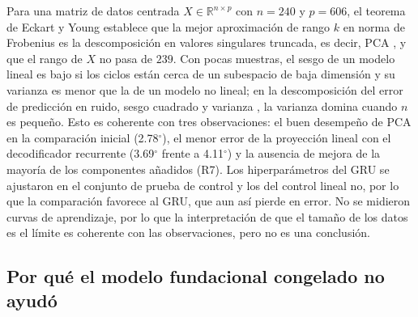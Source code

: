 \documentclass[11pt,a4paper]{article}
\newcommand{\gr}{$^{\circ}$}
\newcommand{\R}{\mathbb{R}}
\begin{document}
Para una matriz de datos centrada $X\in\R^{n\times p}$ con $n=240$ y $p=606$, el teorema de Eckart y Young \cite{eckart1936} establece que la mejor aproximación de rango $k$ en norma de Frobenius es la descomposición en valores singulares truncada, es decir, PCA \cite{jolliffe2016}, y que el rango de $X$ no pasa de $239$. Con pocas muestras, el sesgo de un modelo lineal es bajo si los ciclos están cerca de un subespacio de baja dimensión y su varianza es menor que la de un modelo no lineal; en la descomposición del error de predicción en ruido, sesgo cuadrado y varianza \cite{hastie2009}, la varianza domina cuando $n$ es pequeño. Esto es coherente con tres observaciones: el buen desempeño de PCA en la comparación inicial (2.78\gr), el menor error de la proyección lineal con el decodificador recurrente (3.69\gr{} frente a 4.11\gr) y la ausencia de mejora de la mayoría de los componentes añadidos (R7). Los hiperparámetros del GRU se ajustaron en el conjunto de prueba de control y los del control lineal no, por lo que la comparación favorece al GRU, que aun así pierde en error. No se midieron curvas de aprendizaje, por lo que la interpretación de que el tamaño de los datos es el límite es coherente con las observaciones, pero no es una conclusión.

\subsection{Por qué el modelo fundacional congelado no ayudó}
\end{document}
